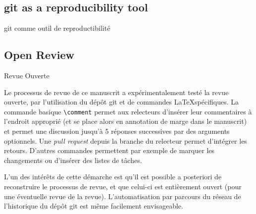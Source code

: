 \subsection{git as a reproducibility tool}{git comme outil de reproductibilité}






\subsection{Open Review}{Revue Ouverte}

Le processus de revue de ce manuscrit a expérimentalement testé la revue ouverte, par l'utilisation du dépôt git et de commandes \LaTeX spécifiques. La commande basique \texttt{{\textbackslash}comment} permet aux relecteurs d'insérer leur commentaires à l'endroit approprié (et se place alors en annotation de marge dans le manuscrit) et permet une discussion jusqu'à 5 réponses successives par des arguments optionnels. Une \emph{pull request} depuis la branche du relecteur permet d'intégrer les retours. D'autres commandes permettent par exemple de marquer les changements ou d'insérer des listes de tâches.

L'un des intérêts de cette démarche est qu'il est possible a posteriori de reconstruire le processus de revue, et que celui-ci est entièrement ouvert (pour une éventuelle revue de la revue). L'automatisation par parcours du réseau de l'historique du dépôt git est même facilement envisageable.



